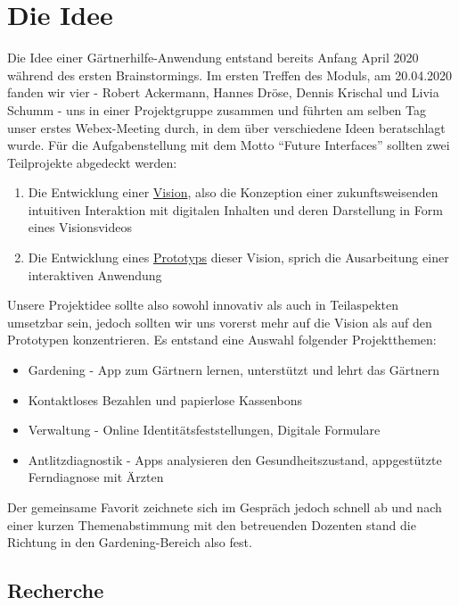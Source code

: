 \hypertarget{die-idee}{%
\section{Die Idee}\label{die-idee}}

Die Idee einer Gärtnerhilfe-Anwendung entstand bereits Anfang April 2020
während des ersten Brainstormings. Im ersten Treffen des Moduls, am
20.04.2020 fanden wir vier - Robert Ackermann, Hannes Dröse, Dennis
Krischal und Livia Schumm - uns in einer Projektgruppe zusammen und
führten am selben Tag unser erstes Webex-Meeting durch, in dem über
verschiedene Ideen beratschlagt wurde. Für die Aufgabenstellung mit dem
Motto ``Future Interfaces'' sollten zwei Teilprojekte abgedeckt werden:

\begin{enumerate}
\def\labelenumi{\arabic{enumi}.}
\tightlist
\item
  Die Entwicklung einer \protect\hyperlink{vision}{Vision}, also die
  Konzeption einer zukunftsweisenden intuitiven Interaktion mit
  digitalen Inhalten und deren Darstellung in Form eines Visionsvideos
\item
  Die Entwicklung eines \protect\hyperlink{prototyp}{Prototyps} dieser
  Vision, sprich die Ausarbeitung einer interaktiven Anwendung
\end{enumerate}

Unsere Projektidee sollte also sowohl innovativ als auch in Teilaspekten
umsetzbar sein, jedoch sollten wir uns vorerst mehr auf die Vision als
auf den Prototypen konzentrieren. Es entstand eine Auswahl folgender
Projektthemen:

\begin{itemize}
\tightlist
\item
  Gardening - App zum Gärtnern lernen, unterstützt und lehrt das
  Gärtnern
\item
  Kontaktloses Bezahlen und papierlose Kassenbons
\item
  Verwaltung - Online Identitätsfeststellungen, Digitale Formulare
\item
  Antlitzdiagnostik - Apps analysieren den Gesundheitszustand,
  appgestützte Ferndiagnose mit Ärzten
\end{itemize}

Der gemeinsame Favorit zeichnete sich im Gespräch jedoch schnell ab und
nach einer kurzen Themenabstimmung mit den betreuenden Dozenten stand
die Richtung in den Gardening-Bereich also fest.

\hypertarget{recherche}{%
\subsection{Recherche}\label{recherche}}

